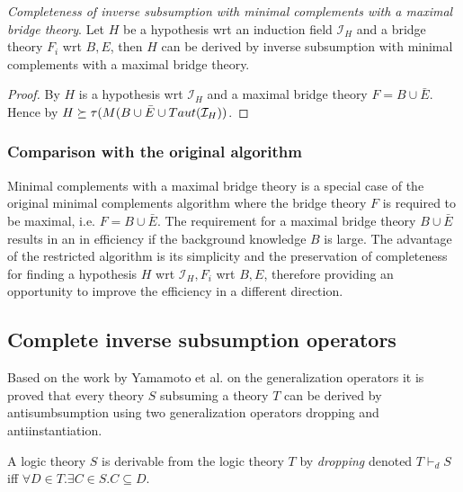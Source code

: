 \begin{proposition}
\label{completeness_of_inverse_subsumption_with_maximal_bridge_theory}
\emph{Completeness of inverse subsumption with minimal complements with a maximal bridge theory}.
Let $H$ be a hypothesis wrt an induction field $\mathcal{I}_H$ and a bridge theory $F_i$ wrt $B, E$, then $H$ can be derived by inverse subsumption with minimal complements with a maximal bridge theory.
\end{proposition}

\begin{proof}
By  $H$ is a hypothesis wrt $\mathcal{I}_H$ and a maximal bridge theory $F=B \cup \bar{E}$.
Hence by  $H \succeq \tau(M(B \cup \bar{E} \cup Taut(\mathcal{I}_H))$.
\end{proof}

\subsubsection{Comparison with the original algorithm}\label{inverse_subsumption_algorithm_comparison}
Minimal complements with a maximal bridge theory is a special case of the original minimal complements algorithm where the bridge theory $F$ is required to be maximal, i.e. $F=B \cup \bar{E}$. The requirement for a maximal bridge theory $B \cup \bar{E}$ results in an in efficiency if the background knowledge $B$ is large. The advantage of the restricted algorithm is its simplicity and the preservation of completeness for finding a hypothesis $H$ wrt $\mathcal{I}_H, F_i$ wrt $B,E$, therefore providing an opportunity to improve the efficiency in a different direction.

\subsection{Complete inverse subsumption operators}\label{complete_inverse_subsumption_operators}
Based on the work by Yamamoto et al. on the generalization operators\cite{yamamoto2008towards} it is proved that every theory $S$ subsuming a theory $T$ can be derived by antisumbsumption using two generalization operators dropping and antiinstantiation.

\begin{defn}
A logic theory $S$ is derivable from the logic theory $T$ by \emph{dropping} denoted $T \vdash_d S$ iff
$\forall D \in T. \exists C \in S. C \subseteq D$.
\end{defn}

